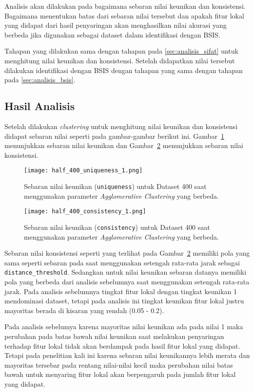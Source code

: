 Analisis akan dilakukan pada bagaimana sebaran nilai keunikan dan konsistensi. Bagaimana menentukan batas dari sebaran nilai tersebut dan apakah fitur lokal yang didapat dari hasil penyaringan akan menghasilkan nilai akurasi yang berbeda jika digunakan sebagai dataset dalam identifikasi dengan BSIS.

Tahapan yang dilakukan sama dengan tahapan pada \ref{sec:analisis_sifat} untuk menghitung nilai keunikan dan konsistensi. Setelah didapatkan nilai tersebut dilakukan identifikasi dengan BSIS dengan tahapan yang sama dengan tahapan pada \ref{sec:analisis_bsis}.

\subsection{Hasil Analisis}
Setelah dilakukan \textit{clustering} untuk menghitung nilai keunikan dan konsistensi didapat sebaran nilai seperti pada gambar-gambar berikut ini. Gambar~\ref{fig:half_400_uniqueness_1} menunjukkan sebaran nilai keunikan dan Gambar~\ref{fig:half_400_consistency_1} menunjukkan sebaran nilai konsistensi.
\begin{figure}[H]
	\centering
	\texttt{[image: half\_400\_uniqueness\_1.png]}
	\caption{Sebaran nilai keunikan (\texttt{uniqueness}) untuk Dataset 400 saat menggunakan parameter \textit{Agglomerative Clustering} yang berbeda.}
	\label{fig:half_400_uniqueness_1}
\end{figure}
\begin{figure}[H]
	\centering
	\texttt{[image: half\_400\_consistency\_1.png]}
	\caption{Sebaran nilai keunikan (\texttt{consistency}) untuk Dataset 400 saat menggunakan parameter \textit{Agglomerative Clustering} yang berbeda.}
	\label{fig:half_400_consistency_1}
\end{figure}
Sebaran nilai konsistensi seperti yang terlihat pada Gambar~\ref{fig:half_400_consistency_1} memiliki pola yang sama seperti sebaran pada saat menggunakan setengah rata-rata jarak sebagai \texttt{distance\_threshold}. Sedangkan untuk nilai keunikan sebaran datanya memiliki pola yang berbeda dari analisis sebelumnya saat menggunakan setengah rata-rata jarak. Pada analisis sebelumnya tingkat fitur lokal dengan tingkat keunikan 1 mendominasi dataset, tetapi pada analisis ini tingkat keunikan fitur lokal justru mayoritas berada di kisaran yang rendah (0.05 - 0.2). 

Pada analisis sebelumya karena mayoritas nilai keunikan ada pada nilai 1 maka perubahan pada batas bawah nilai keunikan saat melakukan penyaringan terhadap fitur lokal tidak akan berdampak pada hasil fitur lokal yang didapat. Tetapi pada penelitian kali ini karena sebaran nilai keunikannya lebih merata dan mayoritas tersebar pada rentang nilai-nilai kecil maka perubahan nilai batas bawah untuk menyaring fitur lokal akan berpengaruh pada jumlah fitur lokal yang didapat.

